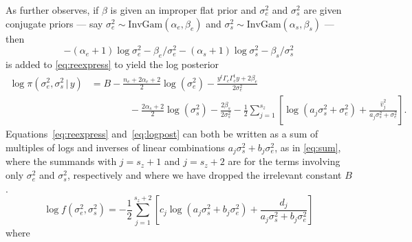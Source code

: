 \documentclass{report}
\newcommand{\IG}{\text{InvGam}}
\newcommand{\RL}{f}
\newcommand{\logRL}{\log\RL}
\newcommand{\sigssq}{\sigma_s^2}
\newcommand{\sigesq}{\sigma_e^2}
\newcommand{\logRLss}{\logRL(\sigesq,\sigssq)}
\newcommand{\ass}{a_j\sigssq + \sigesq}
\newcommand{\abss}{a_j\sigssq + b_j\sigesq}
\newcommand{\g}{\,|\,}
\begin{document}
As \cite{hodges:2013} further observes, if $\beta$ is given an improper flat prior and $\sigesq$ and $\sigssq$ are given conjugate priors --- say $\sigesq \sim \IG(\alpha_e,\beta_e)$ and $\sigssq \sim \IG(\alpha_s,\beta_s)$ --- then \begin{equation*}
  -(\alpha_e+1) \log\sigesq - \beta_e/\sigesq -(\alpha_s+1) \log\sigssq - \beta_s/\sigssq
\end{equation*}
is added to \eqref{eq:reexpress} to yield
the log posterior
\begin{equation}
\label{eq:logpost}
  \begin{split}
  \log\pi(\sigesq,\sigssq\g y) &=
  B - \frac{n_e + 2\alpha_e + 2}{2}\log(\sigesq) -
    \frac{y^t \Gamma_c \Gamma^t_c y + 2\beta_e}{2\sigesq}\\
    &\qquad\qquad - \frac{2\alpha_s + 2} {2}\log(\sigssq) - \frac{2\beta_s}{2\sigssq}
    - \frac{1}{2} \sum_{j=1}^{s_z} \left[ \log(\ass) + \frac{\hat v_j^2}{\ass}\right].
  \end{split}
\end{equation}
Equations~\eqref{eq:reexpress} and~\eqref{eq:logpost} can both be written as a sum of multiples of logs and inverses of linear combinations $\abss$, as in \eqref{eq:sum}, where the summands with $j=s_z+1$ and $j=s_z+2$ are for the terms involving only $\sigesq$ and $\sigssq$, respectively and where we have dropped the irrelevant constant $B$.
\begin{equation}
\label{eq:sum}
  \logRLss = -\frac{1}{2} \sum_{j=1}^{s_z+2}\left[ c_j \log(\abss) + \frac{d_j}{\abss}\right]
\end{equation}
where
\end{document}

